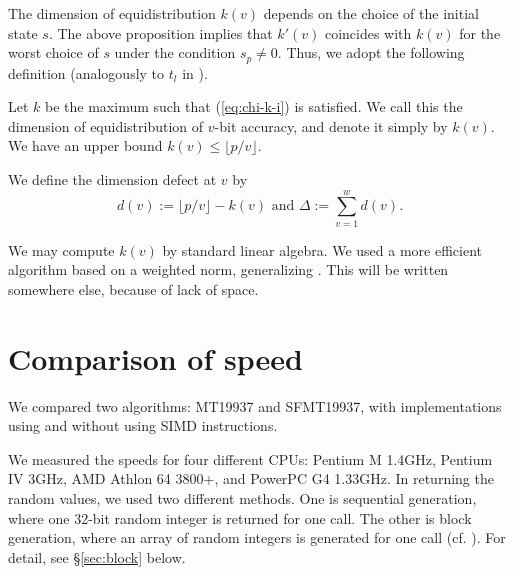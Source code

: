 \documentclass{svmult}
\begin{document}
The dimension of equidistribution $k(v)$ depends on 
the choice of the initial state $s$. The above 
proposition implies that $k'(v)$ coincides 
with $k(v)$ for the worst choice of $s$ under the condition 
$s_p \neq 0$. Thus, we adopt the following definition
(analogously to $t_l$ in \cite{COMBTAUS}).

\begin{definition}\label{def:virtual}
Let $k$ be the maximum such that
(\ref{eq:chi-k-i}) is satisfied. We call this
the dimension of equidistribution
of $v$-bit accuracy, and denote it simply by $k(v)$.
We have an upper bound $k(v) \leq \lfloor p/v \rfloor$.

We define the dimension defect at $v$
by
$$
d(v):=\lfloor p/v \rfloor - k(v) 
\mbox{ and } \Delta:=\sum_{v=1}^w d(v).
$$
\end{definition}
We may compute $k(v)$ by standard linear algebra.
We used a more efficient algorithm based on 
a weighted norm,
generalizing \cite{CLT}. This will be written 
somewhere else,
because of lack of space.


\section{Comparison of  speed}\label{sec:comp-speed}
We compared two algorithms: MT19937 and SFMT19937,
with implementations using and without using SIMD instructions.

We measured the speeds for four different CPUs:
Pentium M 1.4GHz, Pentium IV 3GHz, 
AMD Athlon 64 3800+, and PowerPC G4 1.33GHz.  
In returning the random values, we used two different methods.
One is sequential generation, where one 32-bit random 
integer is returned for one call. 
The other is block generation, where an array
of random integers is generated for one call 
(cf. \cite{knuth:bible}). 
For detail, see \S\ref{sec:block} below. 
\end{document}

